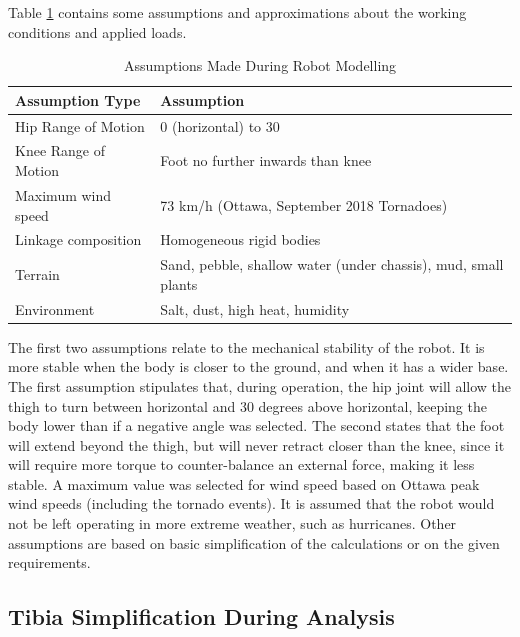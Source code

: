 Table \ref{tab:assumptions} contains some assumptions and approximations about the working conditions and applied loads.

\begin{table}[H]
    \centering
    \caption{Assumptions Made During Robot Modelling}
    \label{tab:assumptions}
    \begin{tabular}{l l}
        \\ \hline
        \textbf{Assumption Type} & \textbf{Assumption} 
        \\ \hline
        Hip Range of Motion & 0\textdegree{} (horizontal) to 30\textdegree{}
        \\
        Knee Range of Motion & Foot no further inwards than knee
        \\
        Maximum wind speed & 73 km/h (Ottawa, September 2018 Tornadoes)
        \\
        Linkage composition & Homogeneous rigid bodies
        \\
        Terrain & Sand, pebble, shallow water (under chassis), mud, small plants
        \\
        Environment & Salt, dust, high heat, humidity
        \\ \hline
    \end{tabular}
\end{table}

The first two assumptions relate to the mechanical stability of the robot. It is more stable when the body is closer to the ground, and when it has a wider base.
The first assumption stipulates that, during operation, the hip joint will allow the thigh to turn between horizontal and 30 degrees above horizontal, keeping the body lower than if a negative angle was selected.
The second states that the foot will extend beyond the thigh, but will never retract closer than the knee, since it will require more torque to counter-balance an external force, making it less stable.
A maximum value was selected for wind speed based on Ottawa peak wind speeds (including the tornado events). It is assumed that the robot would not be left operating in more extreme weather, such as hurricanes.
Other assumptions are based on basic simplification of the calculations or on the given requirements.


\subsection{Tibia Simplification During Analysis}

